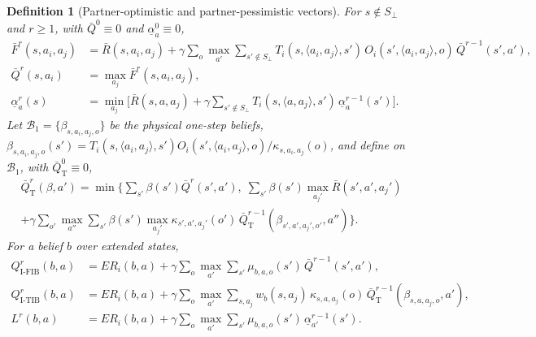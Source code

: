 \documentclass{article}
\newcommand{\ER}{\mathit{ER}}
\newtheorem{definition}{Definition}
\begin{document}
\begin{definition}[Partner-optimistic and partner-pessimistic vectors]
For $s\notin S_\bot$ and $r\ge1$, with $\bar Q^0\equiv0$ and $\underline\alpha^0_a\equiv0$,
\begin{align*}
\bar F^r(s,a_i,a_j)&=\bar R(s,a_i,a_j)+\gamma\sum_{o}\max_{a'}\sum_{s'\notin S_\bot}
T_i(s,\langle a_i,a_j\rangle,s')\,O_i(s',\langle a_i,a_j\rangle,o)\,\bar Q^{r-1}(s',a'),\\
\bar Q^r(s,a_i)&=\max_{a_j}\bar F^r(s,a_i,a_j),\\
\underline\alpha^r_{a}(s)&=\min_{a_j}\Big[\bar R(s,a,a_j)+\gamma\sum_{s'\notin S_\bot}
T_i(s,\langle a,a_j\rangle,s')\,\underline\alpha^{r-1}_{a}(s')\Big].
\end{align*}
Let $\mathcal B_1=\{\beta_{s,a_i,a_j,o}\}$ be the physical one-step beliefs,
$\beta_{s,a_i,a_j,o}(s')=T_i(s,\langle a_i,a_j\rangle,s')O_i(s',\langle a_i,a_j\rangle,o)/\kappa_{s,a_i,a_j}(o)$,
and define on $\mathcal B_1$, with $\bar Q^0_{\mathrm T}\equiv0$,
\begin{multline*}
\bar Q^r_{\mathrm T}(\beta,a')=\min\Big\{\sum_{s'}\beta(s')\bar Q^r(s',a'),\;
\sum_{s'}\beta(s')\max_{a_j'}\bar R(s',a',a_j')\\
+\gamma\sum_{o'}\max_{a''}\sum_{s'}\beta(s')\max_{a_j'}
\kappa_{s',a',a_j'}(o')\,\bar Q^{r-1}_{\mathrm T}(\beta_{s',a',a_j',o'},a'')\Big\}.
\end{multline*}
For a belief $b$ over extended states,
\begin{align*}
Q^r_{\mathrm{I\text{-}FIB}}(b,a)&=\ER_i(b,a)+\gamma\sum_o\max_{a'}\sum_{s'}\mu_{b,a,o}(s')\,\bar Q^{r-1}(s',a'),\\
Q^r_{\mathrm{I\text{-}TIB}}(b,a)&=\ER_i(b,a)+\gamma\sum_o\max_{a'}\sum_{s,a_j}w_b(s,a_j)\,
\kappa_{s,a,a_j}(o)\,\bar Q^{r-1}_{\mathrm T}(\beta_{s,a,a_j,o},a'),\\
L^r(b,a)&=\ER_i(b,a)+\gamma\sum_o\max_{a'}\sum_{s'}\mu_{b,a,o}(s')\,\underline\alpha^{r-1}_{a'}(s').
\end{align*}
\end{definition}
\end{document}
